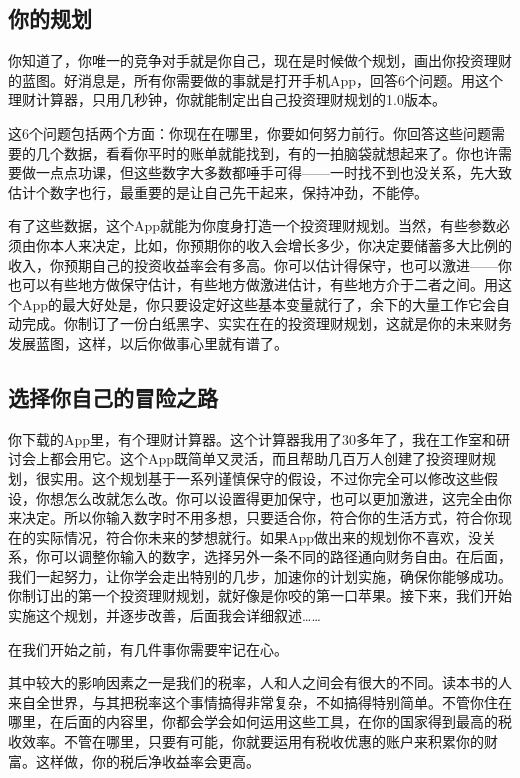 \subsection{你的规划}

你知道了，你唯一的竞争对手就是你自己，现在是时候做个规划，画出你投资理财的蓝图。好消息是，所有你需要做的事就是打开手机App，回答6个问题。用这个理财计算器，只用几秒钟，你就能制定出自己投资理财规划的1.0版本。

这6个问题包括两个方面：你现在在哪里，你要如何努力前行。你回答这些问题需要的几个数据，看看你平时的账单就能找到，有的一拍脑袋就想起来了。你也许需要做一点点功课，但这些数字大多数都唾手可得——一时找不到也没关系，先大致估计个数字也行，最重要的是让自己先干起来，保持冲劲，不能停。

有了这些数据，这个App就能为你度身打造一个投资理财规划。当然，有些参数必须由你本人来决定，比如，你预期你的收入会增长多少，你决定要储蓄多大比例的收入，你预期自己的投资收益率会有多高。你可以估计得保守，也可以激进——你也可以有些地方做保守估计，有些地方做激进估计，有些地方介于二者之间。用这个App的最大好处是，你只要设定好这些基本变量就行了，余下的大量工作它会自动完成。你制订了一份白纸黑字、实实在在的投资理财规划，这就是你的未来财务发展蓝图，这样，以后你做事心里就有谱了。

\subsection{选择你自己的冒险之路}

你下载的App里，有个理财计算器。这个计算器我用了30多年了，我在工作室和研讨会上都会用它。这个App既简单又灵活，而且帮助几百万人创建了投资理财规划，很实用。这个规划基于一系列谨慎保守的假设，不过你完全可以修改这些假设，你想怎么改就怎么改。你可以设置得更加保守，也可以更加激进，这完全由你来决定。所以你输入数字时不用多想，只要适合你，符合你的生活方式，符合你现在的实际情况，符合你未来的梦想就行。如果App做出来的规划你不喜欢，没关系，你可以调整你输入的数字，选择另外一条不同的路径通向财务自由。在后面，我们一起努力，让你学会走出特别的几步，加速你的计划实施，确保你能够成功。你制订出的第一个投资理财规划，就好像是你咬的第一口苹果。接下来，我们开始实施这个规划，并逐步改善，后面我会详细叙述……

在我们开始之前，有几件事你需要牢记在心。

其中较大的影响因素之一是我们的税率，人和人之间会有很大的不同。读本书的人来自全世界，与其把税率这个事情搞得非常复杂，不如搞得特别简单。不管你住在哪里，在后面的内容里，你都会学会如何运用这些工具，在你的国家得到最高的税收效率。不管在哪里，只要有可能，你就要运用有税收优惠的账户来积累你的财富。这样做，你的税后净收益率会更高。

